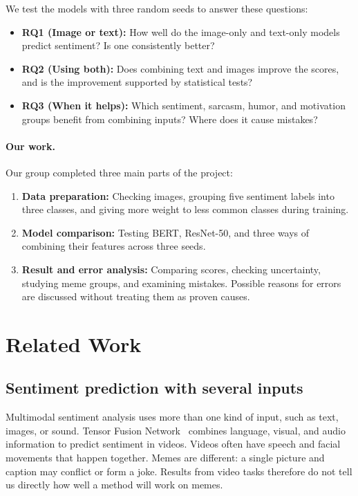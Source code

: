 \documentclass[11pt,a4paper]{article}
\begin{document}
We test the models with three random seeds to answer these questions:
\begin{itemize}[leftmargin=*,itemsep=1pt,topsep=2pt]
\item \textbf{RQ1 (Image or text):} How well do the image-only and text-only models predict sentiment? Is one consistently better?
\item \textbf{RQ2 (Using both):} Does combining text and images improve the scores, and is the improvement supported by statistical tests?
\item \textbf{RQ3 (When it helps):} Which sentiment, sarcasm, humor, and motivation groups benefit from combining inputs? Where does it cause mistakes?
\end{itemize}

\paragraph{Our work.} Our group completed three main parts of the project:
\begin{enumerate}[leftmargin=*,itemsep=1pt,topsep=2pt]
\item \textbf{Data preparation:} Checking images, grouping five sentiment labels into three classes, and giving more weight to less common classes during training.
\item \textbf{Model comparison:} Testing BERT, ResNet-50, and three ways of combining their features across three seeds.
\item \textbf{Result and error analysis:} Comparing scores, checking uncertainty, studying meme groups, and examining mistakes. Possible reasons for errors are discussed without treating them as proven causes.
\end{enumerate}

\section{Related Work}
\label{sec:related}

\subsection{Sentiment prediction with several inputs}
Multimodal sentiment analysis uses more than one kind of input, such as text, images, or sound. Tensor Fusion Network~\cite{zadeh2017tensor} combines language, visual, and audio information to predict sentiment in videos. Videos often have speech and facial movements that happen together. Memes are different: a single picture and caption may conflict or form a joke. Results from video tasks therefore do not tell us directly how well a method will work on memes.
\end{document}
